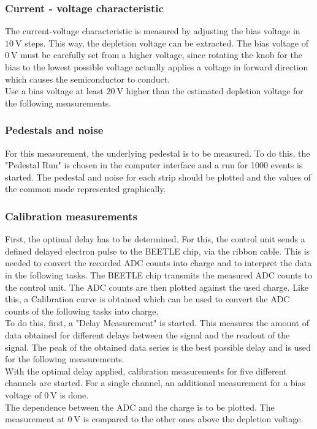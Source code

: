 \subsubsection{Current - voltage characteristic}
\label{measure:1}
The current-voltage characteristic is measured by adjusting the bias voltage in $\qty{10}{\volt}$ steps. This way,
the depletion voltage can be extracted. The bias voltage of $\qty{0}{\volt}$ must be carefully set from a higher voltage,
since rotating the knob for the bias to the lowest possible voltage actually applies a voltage in forward direction which causes
the semiconductor to conduct.\\
Use a bias voltage at least $\qty{20}{\volt}$ higher than the estimated depletion voltage for the following measurements.

\subsubsection{Pedestals and noise}
\label{measure:2}
For this measurement, the underlying pedestal is to be measured. To do this, the "Pedestal Run" is chosen in the computer
interface and a run for 1000 events is started. The pedestal and noise for each strip should be plotted and the values of the
common mode represented graphically.

\subsubsection{Calibration measurements}
\label{measure:3}
First, the optimal delay has to be determined. For this, the control unit sends a defined delayed electron pulse to the BEETLE chip,
via the ribbon cable. This is needed to convert the recorded ADC counts into charge and to interpret the data in the following
tasks. The BEETLE chip transmits the measured ADC counts to the control unit. The ADC counts are then plotted against
the used charge. Like this, a Calibration curve is obtained which can be used to convert the ADC counts of the following
tasks into charge.\\
To do this, first, a "Delay Measurement" is started. This measures the amount of data obtained for different delays between
the signal and the readout of the signal. The peak of the obtained data series is the best possible delay and is used 
for the following measurements.\\
With the optimal delay applied, calibration measurements for five different channels are started. For a single channel, an additional
measurement for a bias voltage of $\qty{0}{\volt}$ is done.\\
The dependence between the ADC and the charge is to be plotted. The measurement at $\qty{0}{\volt}$ is compared to the other ones above 
the depletion voltage.


